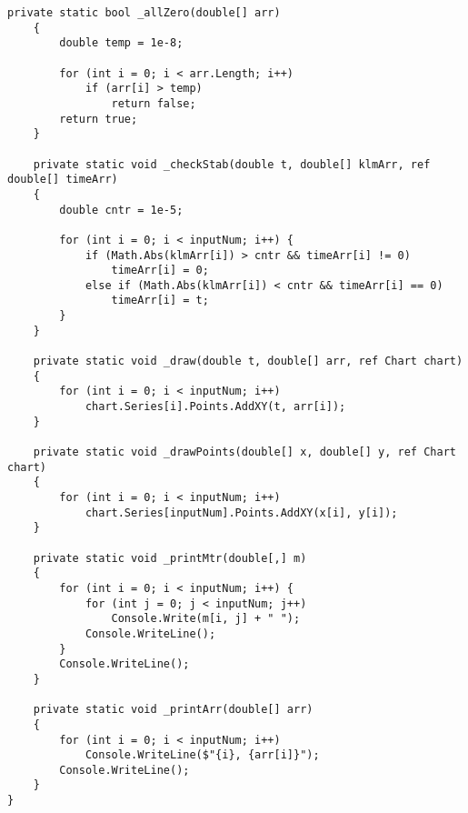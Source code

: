 \begin{lstlisting}[label=code, caption = Основные методы]
	private static bool _allZero(double[] arr)
	{
		double temp = 1e-8;
		
		for (int i = 0; i < arr.Length; i++)
			if (arr[i] > temp)
				return false;
		return true;
	}
	
	private static void _checkStab(double t, double[] klmArr, ref double[] timeArr)
	{
		double cntr = 1e-5;
		
		for (int i = 0; i < inputNum; i++) {
			if (Math.Abs(klmArr[i]) > cntr && timeArr[i] != 0)
				timeArr[i] = 0;
			else if (Math.Abs(klmArr[i]) < cntr && timeArr[i] == 0)
				timeArr[i] = t;
		}
	}
	
	private static void _draw(double t, double[] arr, ref Chart chart)
	{
		for (int i = 0; i < inputNum; i++)
			chart.Series[i].Points.AddXY(t, arr[i]);
	}
	
	private static void _drawPoints(double[] x, double[] y, ref Chart chart)
	{
		for (int i = 0; i < inputNum; i++)
			chart.Series[inputNum].Points.AddXY(x[i], y[i]);
	}
	
	private static void _printMtr(double[,] m)
	{
		for (int i = 0; i < inputNum; i++) {
			for (int j = 0; j < inputNum; j++)
				Console.Write(m[i, j] + " ");
			Console.WriteLine();
		}
		Console.WriteLine();
	}
	
	private static void _printArr(double[] arr)
	{
		for (int i = 0; i < inputNum; i++)
			Console.WriteLine($"{i}, {arr[i]}");
		Console.WriteLine();
	}
}

\end{lstlisting}